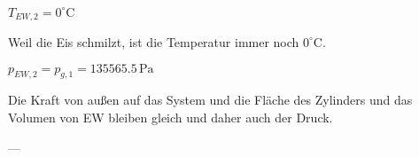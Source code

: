 \( T_{EW,2} = 0^\circ \text{C} \)  

Weil die Eis schmilzt, ist die Temperatur immer noch \( 0^\circ \text{C} \).  

\( p_{EW,2} = p_{g,1} = 135565.5 \, \text{Pa} \)  

Die Kraft von außen auf das System und die Fläche des Zylinders und das Volumen von EW bleiben gleich und daher auch der Druck.  

---